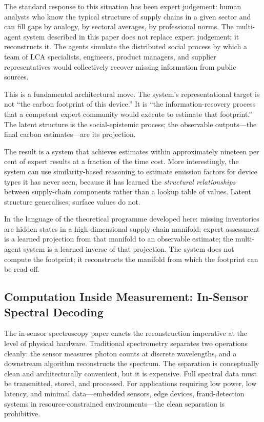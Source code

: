\documentclass[12pt, letterpaper]{article}
\theoremstyle{remark}
\begin{document}
The standard response to this situation has been expert judgement: human
analysts who know the typical structure of supply chains in a given sector
and can fill gaps by analogy, by sectoral averages, by professional norms.
The multi-agent system described in this paper does not replace expert
judgement; it reconstructs it.  The agents simulate the distributed social
process by which a team of LCA specialists, engineers, product managers,
and supplier representatives would collectively recover missing information
from public sources.

This is a fundamental architectural move.  The system's representational
target is not ``the carbon footprint of this device.''  It is ``the
information-recovery process that a competent expert community would execute
to estimate that footprint.''  The latent structure is the social-epistemic
process; the observable outputs---the final carbon estimates---are its
projection.

The result is a system that achieves estimates within approximately nineteen
per cent of expert results at a fraction of the time cost.  More
interestingly, the system can use similarity-based reasoning to estimate
emission factors for device types it has never seen, because it has learned
the \emph{structural relationships} between supply-chain components rather
than a lookup table of values.  Latent structure generalises; surface
values do not.

In the language of the theoretical programme developed here: missing
inventories are hidden states in a high-dimensional supply-chain manifold;
expert assessment is a learned projection from that manifold to an
observable estimate; the multi-agent system is a learned inverse of that
projection.  The system does not compute the footprint; it reconstructs
the manifold from which the footprint can be read off.

\subsection{Computation Inside Measurement: In-Sensor Spectral Decoding}

The in-sensor spectroscopy paper enacts the reconstruction imperative at
the level of physical hardware.  Traditional spectrometry separates two
operations cleanly: the sensor measures photon counts at discrete
wavelengths, and a downstream algorithm reconstructs the spectrum.  The
separation is conceptually clean and architecturally convenient, but it
is expensive.  Full spectral data must be transmitted, stored, and
processed.  For applications requiring low power, low latency, and minimal
data---embedded sensors, edge devices, fraud-detection systems in
resource-constrained environments---the clean separation is prohibitive.
\end{document}
